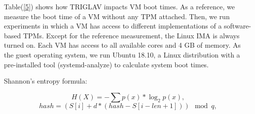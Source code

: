 \documentclass[11pt,twoside]{book}
\begin{document}
\raggedright Table(\ref{5}) shows how TRIGLAV impacts VM boot times. As a reference, we measure the boot time of a VM without any TPM attached. Then, we run experiments in which a VM has access to different implementations of a software-based TPMs. Except for the reference measurement, the Linux IMA is always turned on. Each VM has access to all available cores and 4 GB of memory. As the guest operating system, we run Ubuntu 18.10, a Linux distribution with a pre-installed tool (systemd-analyze) to calculate system boot times.
\raggedright Shannon's entropy formula:

\[H(X) = -\sum{p(x)} * \log_2{p(x)}, \]
\[hash = \left( S[i] + d * (hash - S[i - len + 1])\right)\mod{q}, \]
\end{document}
